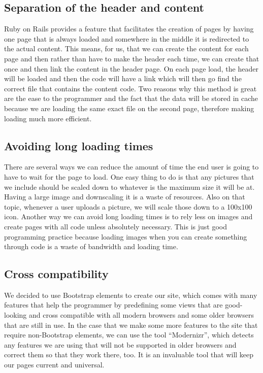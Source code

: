 \subsection{Separation of the header and content}
Ruby on Rails provides a feature that facilitates the creation of pages by having one page that is always loaded and somewhere in the middle it is redirected to the actual content. This means, for us, that we can create the content for each page and then rather than have to make the header each time, we can create that once and then link the content in the header page. On each page load, the header will be loaded and then the code will have a link which will then go find the correct file that contains the content code. Two reasons why this method is great are the ease to the programmer and the fact that the data will be stored in cache because we are loading the same exact file on the second page, therefore making loading much more efficient.
\subsection{Avoiding long loading times}
There are several ways we can reduce the amount of time the end user is going to have to wait for the page to load. One easy thing to do is that any pictures that we include should be scaled down to whatever is the maximum size it will be at. Having a large image and downscaling it is a waste of resources. Also on that topic, whenever a user uploads a picture, we will scale those down to a 100x100 icon. Another way we can avoid long loading times is to rely less on images and create pages with all code unless absolutely necessary. This is just good programming practice because loading images when you can create something through code is a waste of bandwidth and loading time. 
\subsection{Cross compatibility}
We decided to use Bootstrap elements to create our site, which comes with many features that help the programmer by predefining some views that are good-looking and cross compatible with all modern browsers and some older browsers that are still in use. In the case that we make some more features to the site that require non-Bootstrap elements, we can use the tool ``Modernizr'', which detects any features we are using that will not be supported in older browsers and correct them so that they work there, too.\cite{wiki:modern} It is an invaluable tool that will keep our pages current and universal.

